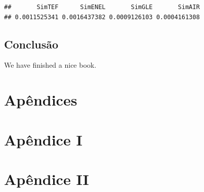 \documentclass[
  12pt,
  a4paper,
  openany]{book}
\newenvironment{Shaded}{\begin{snugshade}}{\end{snugshade}}
\newcommand{\DecValTok}[1]{\textcolor[rgb]{0.00,0.00,0.81}{#1}}
\newcommand{\NormalTok}[1]{#1}
\newcommand{\OperatorTok}[1]{\textcolor[rgb]{0.81,0.36,0.00}{\textbf{#1}}}
\newcommand{\StringTok}[1]{\textcolor[rgb]{0.31,0.60,0.02}{#1}}
\begin{document}
\begin{verbatim}
##       SimTEF      SimENEL       SimGLE       SimAIR 
## 0.0011525341 0.0016437382 0.0009126103 0.0004161308
\end{verbatim}

\begin{Shaded}
\end{Shaded}

\normalsize

\hypertarget{conclusuxe3o}{%
\chapter*{Conclusão}\label{conclusuxe3o}}

We have finished a nice book.

  

\part*{Apêndices}

\newpage
\part*{\normalfont\huge\bfseries\centering Apêndice I}
\newpage

\part*{\normalfont\huge\bfseries\centering Apêndice II}
\newpage
\end{document}
